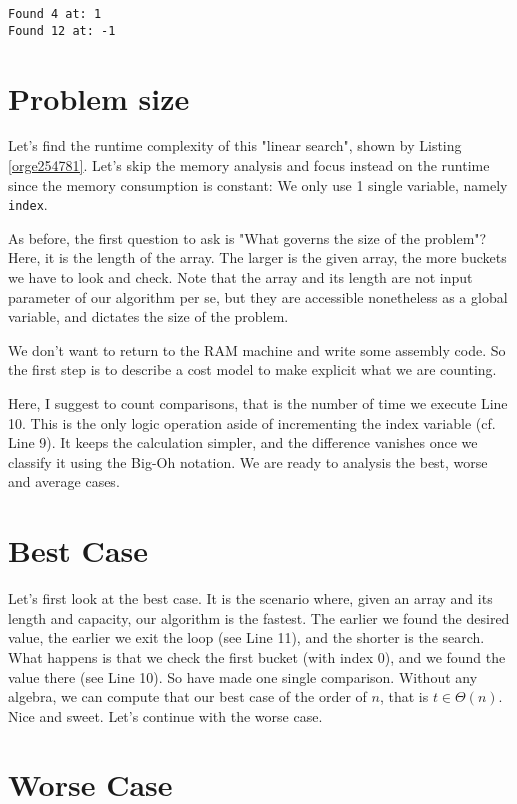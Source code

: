 \documentclass[11pt]{article}
\begin{document}
\begin{verbatim}
Found 4 at: 1
Found 12 at: -1
\end{verbatim}

\section{Problem size}
\label{sec:orgafee275}

Let's find the runtime complexity of this "linear search", shown
by Listing \ref{orge254781}. Let's skip the memory analysis and
focus instead on the runtime since the memory consumption is
constant: We only use 1 single variable, namely \texttt{index}.

As before, the first question to ask is "What governs the size of
the problem"? Here, it is the length of the array. The larger is the
given array, the more buckets we have to look and check. Note that
the array and its length are not input parameter of our algorithm
per se, but they are accessible nonetheless as a global variable,
and dictates the size of the problem.

We don't want to return to the RAM machine and write some assembly
code. So the first step is to describe a cost model to make
explicit what we are counting.

Here, I suggest to count comparisons, that is the number of time we
execute Line 10. This is the only logic operation aside of
incrementing the index variable (cf. Line 9). It keeps the
calculation simpler, and the difference vanishes once we classify it
using the Big-Oh notation. We are ready to analysis the best, worse
and average cases.

\section{Best Case}
\label{sec:orgadb5753}

Let's first look at the best case. It is the scenario where, given
an array and its length and capacity, our algorithm is the
fastest. The earlier we found the desired value, the earlier we exit
the loop (see Line 11), and the shorter is the search. What
happens is that we check the first bucket (with index 0), and we
found the value there (see Line 10). So have made one single
comparison. Without any algebra, we can compute that our best case
of the order of \(n\), that is \(t \in \Theta(n)\). Nice and
sweet. Let's continue with the worse case.

\section{Worse Case}
\label{sec:orgb55d96b}
\end{document}
